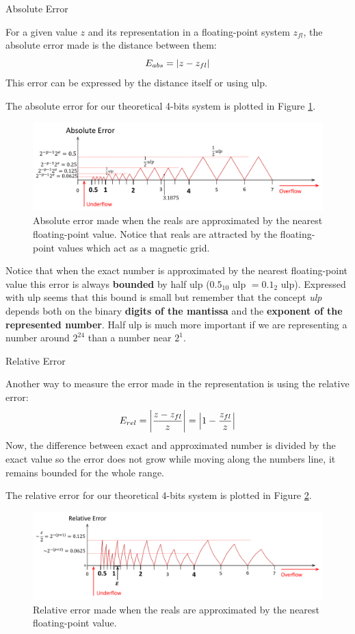 {\Large Absolute Error}

For a given value $z$ and its representation in a floating-point system $z_{fl}$, 
the absolute error made is the distance between them:
$$
E_{abs} = \abs{z - z_{fl}} 
$$
This error can be expressed by the distance itself or using ulp.

The absolute error for our theoretical 4-bits system is plotted in Figure \ref{fig:AbsErrorGraph}.
\begin{figure}[h]
    \centering
    \includegraphics[width= \textwidth]{./doc/Figures/AbsErrorGraph.png}
    \caption{Absolute error made when the reals are approximated by the nearest floating-point value. Notice that reals are attracted by the floating-point values which act as a magnetic grid.}
    \label{fig:AbsErrorGraph}
\end{figure}

Notice that when the exact number is approximated by the nearest floating-point value 
this error is always \textbf{bounded} by half ulp ($0.5_{10}$ ulp $= 0.1_2$ ulp). 
Expressed with ulp seems that this bound is small but remember that the concept \textit{ulp} depends both on 
the binary \textbf{digits of the mantissa} and the \textbf{exponent of the represented number}.
Half ulp is much more important if we are representing a number around $2^{24}$ than a number near $2^1$.





{\Large Relative Error}


Another way to measure the error made in the representation is using the relative error:
$$
E_{rel} = \abs{\frac{z - z_{fl}}{z}} = \abs{1 - \frac{z_{fl}}{z}}
$$
Now, the difference between exact and approximated number is divided by the exact value so
the error does not grow while moving along the numbers line, 
it remains bounded for the whole range. 

The relative error for our theoretical 4-bits system is plotted in Figure \ref{fig:RelErrorGraph}.
\begin{figure}[h]
    \centering
    \includegraphics[width= \textwidth]{./doc/Figures/RelErrorGraph.png}
    \caption{Relative error made when the reals are approximated by the nearest floating-point value.}
    \label{fig:RelErrorGraph}
\end{figure}

